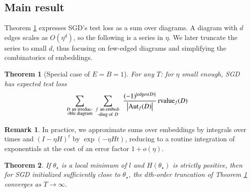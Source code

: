 \documentclass{article}
\theoremstyle{plain}
\newtheorem{thm}{Theorem}
\theoremstyle{definition}
\newtheorem{rmk}{Remark}
\newcommand{\wabs}[1]{\left|#1\right|}
\newcommand{\Aut}{\text{\textnormal{Aut}}}
\newcommand{\rvalue}{\text{\textnormal{rvalue}}}
\newcommand{\edges}{\text{\textnormal{edges}}}
\begin{document}
    \subsection{Main result}

        Theorem \ref{thm:resum} expresses SGD's test loss as a sum over
        diagrams.  A diagram with $d$ edges scales as $O(\eta^d)$, so the
        following is a series in $\eta$.  We later truncate the series to small
        $d$, thus focusing on few-edged diagrams and simplifying the
        combinatorics of embeddings.
        \begin{thm}[Special case of $E=B=1$] \label{thm:resum}
            For any $T$: for $\eta$ small enough, SGD has expected test loss
            \begin{equation*} \label{eq:resum}
                \sum_{\substack{D~\text{an irreduc-} \\ \text{-ible diagram}}}
                ~
                \sum_{\substack{f~\text{an embed-} \\ \text{-ding of}~D}}
                ~
                \frac{(-1)^{|\edges(D)|}}{\wabs{\Aut_f(D)}}
                \,
                {\rvalue_f}(D)
            \end{equation*}
        \end{thm}

 
        \begin{rmk} \label{rmk:integrate}
            In practice, we approximate sums over embeddings by integrals over
            times and $(I-\eta H)^t$ by $\exp(- \eta H t)$, reducing to a
            routine integration of exponentials at the cost of an error factor
            $1 + o(\eta)$.
        \end{rmk}

 
        \begin{thm} \label{thm:converge}
            If $\theta_\star$ is a local minimum of $l$ and $H(\theta_\star)$
            is strictly positive, then for SGD initialized sufficiently close
            to $\theta_\star$, the $d$th-order truncation of Theorem
            \ref{thm:resum} converges as $T\to \infty$.
        \end{thm}
\end{document}
